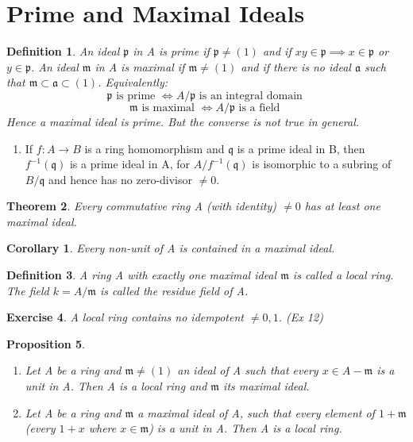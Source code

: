 \documentclass[]{report}
\newtheorem{theorem}{Theorem}[section]
\newtheorem{prop}[theorem]{Proposition}
\newtheorem{corollary}{Corollary}[theorem]
\newtheorem{defn}[theorem]{Definition}
\newtheorem{exercise}[theorem]{Exercise}
\begin{document}
\section{Prime and Maximal Ideals}

\begin{defn}
    An ideal $\mathfrak{p}$ in A is prime if $\mathfrak{p}\neq (1)$ and if $xy\in \mathfrak{p} \implies x \in \mathfrak{p}$ or $y \in \mathfrak{p}$.
An ideal $\mathfrak{m}$ in A is maximal if $\mathfrak{m} \neq (1)$ and if there is no ideal $\mathfrak{a}$ such that $\mathfrak{m\subset a\subset} (1)$. Equivalently:
$$\mathfrak{p} \text{ is prime } \Leftrightarrow A/\mathfrak{p} \text{ is an integral domain }$$
$$\mathfrak{m} \text{ is maximal } \Leftrightarrow A/\mathfrak{p} \text{ is a field }$$
Hence a maximal ideal is prime. But the converse is not true in general. 
\end{defn}

\begin{enumerate} 
    \item If $f: A \rightarrow B$ is a ring homomorphism and $\mathfrak{q}$ is a prime ideal in B, then $f^{-1}(\mathfrak{q})$ is a prime ideal in A, for $A/f^{-1}(\mathfrak{q})$ is isomorphic to a subring of $B/\mathfrak{q}$ and hence has no zero-divisor $\neq 0$. 
\end{enumerate}

\begin{theorem}
    Every commutative ring A (with identity) $\neq 0$ has at least one maximal ideal.
\end{theorem}

\begin{corollary}
    Every non-unit of A is contained in a maximal ideal.
\end{corollary}

\begin{defn}
    A ring A with exactly one maximal ideal $\mathfrak{m}$ is called a local ring. The field $k=A/\mathfrak{m}$ is called the residue field of A.
\end{defn}

\begin{exercise}
    A local ring contains no idempotent $\neq 0,1$. (Ex 12)
\end{exercise}

\begin{prop}
    \begin{enumerate}
        \item Let A be a ring and $\mathfrak{m} \neq (1)$ an ideal of A such that every $x\in A-\mathfrak{m}$ is a unit in A. Then A is a local ring and $\mathfrak{m}$ its maximal ideal. 
        \item Let A be a ring and $\mathfrak{m}$ a maximal ideal of A, such that every element of $\mathfrak{1+m}$ (every $1+x$ where $x\in \mathfrak{m}$) is a unit in A. Then A is a local ring.
    \end{enumerate}
\end{prop}
\end{document}
